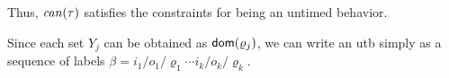 Thus, $\mathit{can}({\tau})$ satisfies the constraints for being an untimed behavior.

Since each set $Y_j$ can be obtained as ${\textsf{dom}}(\varrho_j)$, we can write
an utb simply as a sequence of labels
$\beta  =  {i_1/o_1/\varrho_1}  \cdots {i_k/o_k/\varrho_k}$.

